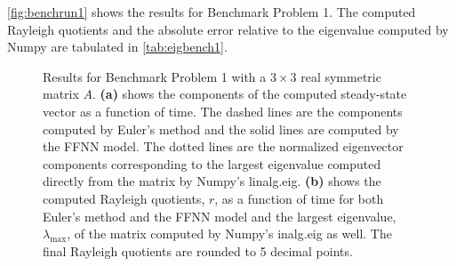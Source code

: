 \autoref{fig:benchrun1} shows the results for Benchmark Problem 1. The computed Rayleigh quotients and the absolute error relative to the eigenvalue computed by Numpy are tabulated in \autoref{tab:eigbench1}. 

\begin{figure}[H]
\centering
{}
\qquad
{}
\caption{Results for Benchmark Problem 1 with a $3\times 3$ real symmetric matrix $A$. \textbf{(a)} shows the components of the computed steady-state vector as a function of time. The dashed lines are the components computed by Euler's method and the solid lines are computed by the FFNN model. The dotted lines are the normalized eigenvector components corresponding to the largest eigenvalue computed directly from the matrix by Numpy's linalg.eig. \textbf{(b)} shows the computed Rayleigh quotients, $r$, as a function of time for both Euler's method and the FFNN model and the largest eigenvalue, $\lambda_\mathrm{max}$, of the matrix computed by Numpy's inalg.eig as well. The final Rayleigh quotients are rounded to 5 decimal points.}
\label{fig:benchrun1}
\end{figure}

